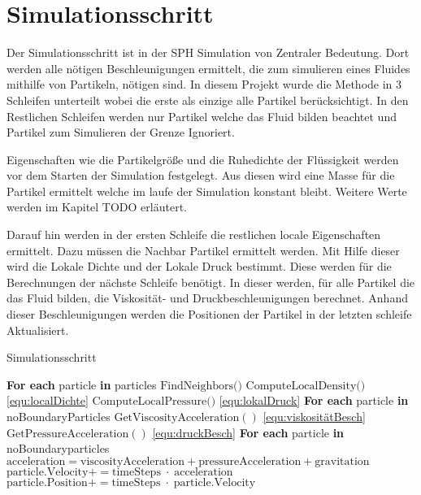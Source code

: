 \documentclass[a4paper, 12pt]{article}
\begin{document}
\section{Simulationsschritt} \label{section_3}
Der Simulationsschritt ist in der SPH Simulation von Zentraler Bedeutung. Dort werden alle nötigen Beschleunigungen ermittelt, die zum simulieren eines Fluides mithilfe von Partikeln, nötigen sind. In diesem Projekt wurde die Methode in 3 Schleifen unterteilt wobei die erste als einzige alle Partikel berücksichtigt. In den Restlichen Schleifen werden nur Partikel welche das Fluid bilden beachtet und Partikel zum Simulieren der Grenze Ignoriert.

Eigenschaften wie die Partikelgröße und die Ruhedichte der Flüssigkeit werden vor dem Starten der Simulation festgelegt. Aus diesen wird eine Masse für die Partikel ermittelt welche im laufe der Simulation konstant bleibt. Weitere Werte werden im Kapitel TODO erläutert. 

Darauf hin werden in der ersten Schleife die restlichen locale Eigenschaften ermittelt. Dazu müssen die Nachbar Partikel ermittelt werden. Mit Hilfe dieser wird die Lokale Dichte und der Lokale Druck bestimmt. Diese werden für die Berechnungen der nächste Schleife benötigt. In dieser werden, für alle Partikel die das Fluid bilden, die Viskosität- und Druckbeschleunigungen berechnet.
Anhand dieser Beschleunigungen werden die Positionen der Partikel in der letzten schleife Aktualisiert. 

\begin{algorithm}[H]
\caption{Simulationsschritt}
\begin{algorithmic}[1]
\State \textbf{For each} particle \textbf{in} particles
\State \quad $\text{FindNeighbors()}$
\State \quad $\text{ComputeLocalDensity()}$ \hfill \eqref{equ:localDichte}
\State \quad $\text{ComputeLocalPressure()}$ \hfill \eqref{equ:lokalDruck}
\vspace{1em}
\State \textbf{For each} particle \textbf{in} noBoundaryParticles
\State \quad $\text{GetViscosityAcceleration}()$ \hfill \eqref{equ:viskositätBesch}
\State \quad $\text{GetPressureAcceleration}()$ \hfill \eqref{equ:druckBesch}
\vspace{1em}
\State \textbf{For each} particle \textbf{in} noBoundaryparticles
\State \quad $\text{acceleration} = \text{viscosityAcceleration} + \text{pressureAcceleration} + \text{gravitation}$
\State \quad $\text{particle.Velocity} += \text{timeSteps}\;\cdot\;\text{acceleration}$
\State \quad $\text{particle.Position} += \text{timeSteps}\;\cdot\;\text{particle.Velocity}$
\end{algorithmic}
\end{algorithm}
\end{document}
